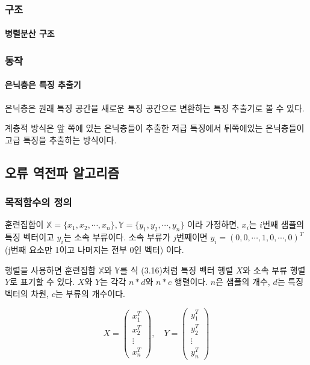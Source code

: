 \documentclass [12pt] {oblivoir}
\let\oldsubsubsection=\subsubsection
\renewcommand{\subsubsection}
{
  \filbreak
  \oldsubsubsection
}
\begin{document}
\subsubsection{구조}

\paragraph*{병렬분산 구조}\mbox{}

\vspace{3mm}

\subsubsection{동작}

\paragraph*{은닉층은 특징 추출기}\mbox{}

은닉층은 원래 특징 공간을 새로운 특징 공간으로 변환하는 특징 추출기로 볼 수 있다.

계층적 방식은 앞 쪽에 있는 은닉층들이 추출한 저급 특징에서 뒤쪽에있는 은닉층들이 고급 특징을 추출하는 방식이다.

\vspace{3mm}

\subsection{오류 역전파 알고리즘}

\subsubsection{목적함수의 정의}

\;훈련집합이 $\mathds{X} = \{x_{1}, x_{2}, \cdots, x_{n}\}, \mathds{Y} = \{y_{1}, y_{2}, \cdots, y_{n}\}$ 이라 가정하면,
$x_{i}$는 $i$번째 샘플의 특징 벡터이고 $y_{i}$는 소속 부류이다.
소속 부류가 $j$번째이면 $y_{i} = (0, 0, \cdots, 1, 0, \cdots, 0)^{T}$ (j번째 요소만 1이고 나머지는 전부 0인 벡터) 이다.

행렬을 사용하면 훈련집합 $\mathds{X}$와 $\mathds{Y}$를 식 (3.16)처럼 특징 벡터 행렬 $X$와 소속 부류 행렬 $Y$로 표기할 수 있다.
$X$와 $Y$는 각각 $n*d$와 $n*c$ 행렬이다. $n$은 샘플의 개수,  $d$는 특징 벡터의 차원, $c$는 부류의 개수이다.

\begin{equation} \tag{3.16}
  X =
  \begin{pmatrix}
    x^{T}_{1} \\
    x^{T}_{2} \\
    \vdots \\
    x^{T}_{n}
  \end{pmatrix},
  \quad
  Y =
  \begin{pmatrix}
    y^{T}_{1} \\
    y^{T}_{2} \\
    \vdots \\
    y^{T}_{n}
  \end{pmatrix}
\end{equation}
\end{document}
